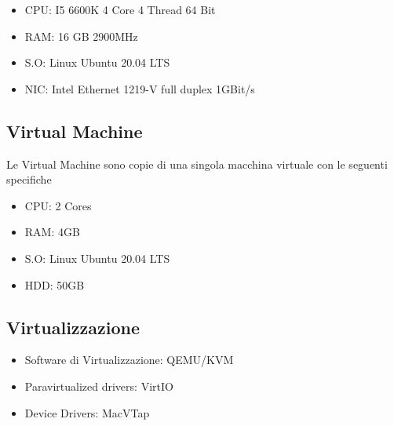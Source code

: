 \begin{itemize}
    \item CPU: I5 6600K 4 Core 4 Thread 64 Bit
    \item RAM: 16 GB 2900MHz
    \item S.O: Linux Ubuntu 20.04 LTS
    \item NIC: Intel Ethernet 1219-V full duplex 1GBit/s
\end{itemize}

\subsection*{Virtual Machine}
Le Virtual Machine sono copie di una singola macchina virtuale con le seguenti specifiche
\begin{itemize}
    \item CPU: 2 Cores
    \item RAM: 4GB
    \item S.O: Linux Ubuntu 20.04 LTS
    \item HDD: 50GB
\end{itemize}

\subsection*{Virtualizzazione}
\begin{itemize}
    \item Software di Virtualizzazione: QEMU/KVM \cite{noauthor_qemu_nodate}
    \item Paravirtualized drivers: VirtIO
    \item Device Drivers: MacVTap
\end{itemize}



